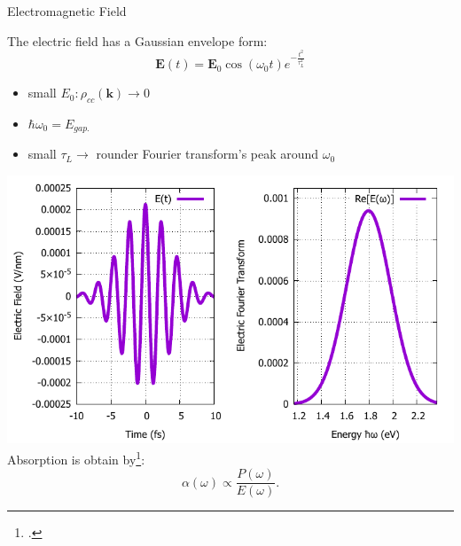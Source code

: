 \documentclass{beamer}
\begin{document}
	\begin{frame}{Electromagnetic Field}
	\begin{multicols}{2}
The electric field has a Gaussian envelope form:
\begin{equation}
	\textbf{E}(t) = \textbf{E}_0 \cos(\omega_0 t)e^{-\frac{t^2}{\tau_L^2}}
\end{equation}
\begin{itemize}
	\item small $E_0: \rho_{cc}(\textbf{k}) \to 0$
	\item $\hbar \omega_0 = E_{gap.}$
	\item small $\tau_L \to $ rounder Fourier transform's peak around $\omega_0$
\end{itemize}
\columnbreak
\includegraphics[width=1\linewidth]{images/Eat.pdf}
Absorption is obtain by\footcite{haug_quantum_2009}:
\begin{equation}
	\alpha(\omega) \propto \frac{P(\omega)}{E(\omega)}.
\end{equation}
	\end{multicols}
	\end{frame}
\end{document}
